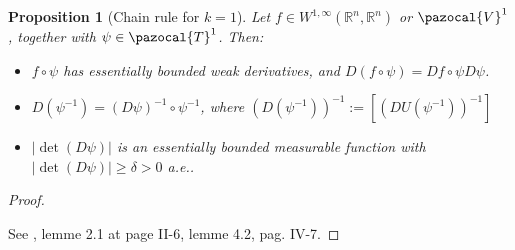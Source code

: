 \documentclass[english,a4paper,9pt,oneside]{scrbook}	%
\theoremstyle{break}
\newtheorem{prop}[equation]{Proposition}
\newenvironment{mproof}[1][\proofname]{%
  \begin{proof}[#1]$ $\par\nobreak\ignorespaces
}{%
  \end{proof}
}
\renewcommand*{\proofname}{Proof}
\theoremstyle{remark}
\newcommand{\mR}{\mathbb{R}}
\newcommand{\cV}{\pazocal{V}}
\newcommand{\cT}{\pazocal{T}}
\begin{document}
\begin{appendices}
\begin{prop}[Chain rule for $k=1$]
\label{prop:chain}
Let $f \in W^{1,\infty}(\mR^n,\mR^n)$ or $\cV^1$, together with $\psi \in \cT^1$.  Then:

\begin{itemize}

\item $f \circ \psi$ has essentially bounded weak derivatives, and $D(f \circ \psi) = Df \circ \psi D\psi$.

\item  $D(\psi^{-1}) = (D\psi)^{-1} \circ \psi^{-1}$, where $(D(\psi^{-1}))^{-1}:=[(DU(\psi^{-1}))^{-1}]$

\item $|\det(D\psi)|$ is an essentially bounded measurable function with $|\det(D\psi)|\geq \delta>0$ a.e.. 
\end{itemize} 

\end{prop}
\begin{mproof}
See \cite{murat}, lemme 2.1 at page II-6, lemme 4.2, pag. IV-7.


\end{mproof}
\end{appendices}
\end{document}
